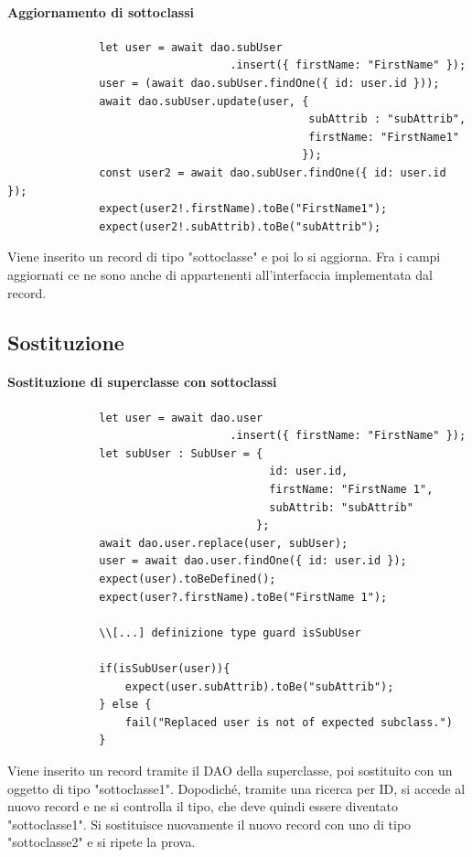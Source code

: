 \documentclass[a4paper, 12pt]{report}
\begin{document}
          \paragraph{Aggiornamento di sottoclassi}
            \begin{Verbatim}
              let user = await dao.subUser
                                  .insert({ firstName: "FirstName" });
              user = (await dao.subUser.findOne({ id: user.id }));
              await dao.subUser.update(user, { 
                                              subAttrib : "subAttrib",
                                              firstName: "FirstName1"
                                             });
              const user2 = await dao.subUser.findOne({ id: user.id });
              expect(user2!.firstName).toBe("FirstName1");
              expect(user2!.subAttrib).toBe("subAttrib");
            \end{Verbatim}
            Viene inserito un record di tipo "sottoclasse" e poi lo si aggiorna.
            Fra i campi aggiornati ce ne sono anche di appartenenti all'interfaccia implementata dal record.
        \subsection{Sostituzione}
          \paragraph{Sostituzione di superclasse con sottoclassi}
            \begin{Verbatim}
              let user = await dao.user
                                  .insert({ firstName: "FirstName" });
              let subUser : SubUser = { 
                                        id: user.id,
                                        firstName: "FirstName 1",
                                        subAttrib: "subAttrib"
                                      };
              await dao.user.replace(user, subUser);
              user = await dao.user.findOne({ id: user.id });
              expect(user).toBeDefined();
              expect(user?.firstName).toBe("FirstName 1");

              \\[...] definizione type guard isSubUser
          
              if(isSubUser(user)){
                  expect(user.subAttrib).toBe("subAttrib");
              } else {
                  fail("Replaced user is not of expected subclass.")
              }
            \end{Verbatim}
            Viene inserito un record tramite il DAO della superclasse, poi sostituito con un oggetto di tipo "sottoclasse1".
            Dopodiché, tramite una ricerca per ID, si accede al nuovo record e ne si controlla il tipo, che deve quindi essere diventato "sottoclasse1".
            Si sostituisce nuovamente il nuovo record con uno di tipo "sottoclasse2" e si ripete la prova.
\end{document}
